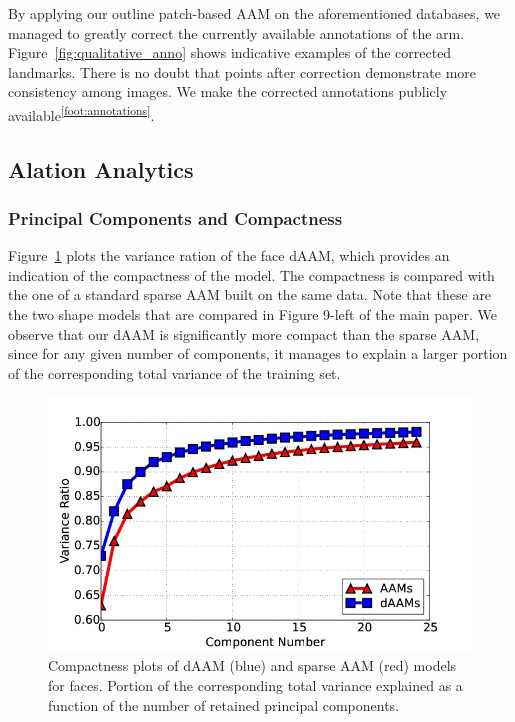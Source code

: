 By applying our outline patch-based AAM on the aforementioned databases, we managed to greatly correct the currently available annotations of the arm. Figure~\ref{fig:qualitative_anno} shows indicative examples of the corrected landmarks. There is no doubt that points after correction demonstrate more consistency among images. We make the corrected annotations publicly available\textsuperscript{\ref{foot:annotations}}.


\subsection{Alation Analytics}
\subsubsection{Principal Components and Compactness}

Figure~\ref{fig:compact} plots the variance ration of the face dAAM, which provides an indication of the compactness of the model. The compactness is compared with the one of a standard sparse AAM built on the same data. Note that these are the two shape models that are compared in Figure 9-left of the main paper. We observe that our dAAM is significantly more compact than the sparse AAM, since for any given number of components, it manages to explain a larger portion of the corresponding total variance of the training set. 


\begin{figure}
    \centering
    \includegraphics[width=\columnwidth]{resources/Annotation_Correction/Suplementory_Meterial/Model_Analysis/cumu_var_ratio}
    \caption{Compactness plots of dAAM (blue) and sparse AAM (red) models for faces. Portion of the corresponding total variance explained as a function of the number of retained principal components.}
    \label{fig:compact}
\end{figure}

